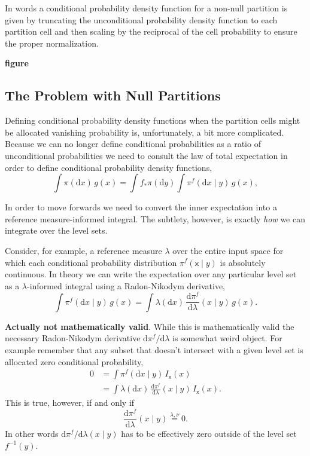 \documentclass[11pt, oneside]{article}
\newcommand{\rnd}[2]{
  \ensuremath{ \frac{ \mathrm{d} #1}{ \mathrm{d} #2 } }
}
\begin{document}
In words a conditional probability density function for a non-null partition is given 
by truncating the unconditional probability density function to each partition cell 
and then scaling by the reciprocal of the cell probability to ensure the proper 
normalization.

\textbf{figure}

\subsection{The Problem with Null Partitions}

Defining conditional probability density functions when the partition cells might 
be allocated vanishing probability is, unfortunately, a bit more complicated.
Because we can no longer define conditional probabilities as a ratio of unconditional 
probabilities we need to consult the law of total expectation in order to define 
conditional probability density functions,
%
\begin{equation*}
\int \pi( \mathrm{d} x ) \, g(x)
=
\int f_{*} \pi (\mathrm{d} y) \int \pi^{f}( \mathrm{d}x \mid y ) \, g(x),
\end{equation*}

In order to move forwards we need to convert the inner expectation into a reference 
measure-informed integral.  The subtlety, however, is exactly \emph{how} we can 
integrate over the level sets.

Consider, for example, a reference measure $\lambda$ over the entire input space
for which each conditional probability distribution $\pi^{f}( \mathsf{x} \mid y)$
is absolutely continuous.  In theory we can write the expectation over any 
particular level set as a $\lambda$-informed integral using a Radon-Nikodym
derivative,
%
\begin{equation*}
\int \pi^{f}( \mathrm{d}x \mid y ) \, g(x)
=
\int \lambda( \mathrm{d} x ) \, \rnd{ \pi^{f} }{ \lambda} (x \mid y) \, g(x).
\end{equation*}

\textbf{Actually not mathematically valid}.
While this is mathematically valid the necessary Radon-Nikodym derivative 
$\mathrm{d} \pi^{f} / \mathrm{d} \lambda$ is somewhat weird object.  For example 
remember that any subset that doesn't intersect with a given level set is allocated 
zero conditional probability,
%
\begin{align*}
0
&=
\int \pi^{f}( \mathrm{d}x \mid y ) \, I_{\mathsf{x}}(x)
\\
&=
\int \lambda( \mathrm{d} x ) \, \rnd{ \pi^{f} }{ \lambda } (x \mid y) \, I_{\mathsf{x}}(x).
\end{align*}
%
This is true, however, if and only if
%
\begin{equation*}
\rnd{ \pi^{f} }{ \lambda } (x \mid y) \overset{\lambda, \nu}{=} 0.
\end{equation*}
%
In other words $\mathrm{d} \pi^{f} / \mathrm{d} \lambda(x \mid y)$ has to be effectively 
zero outside of the level set $f^{-1}(y)$.
\end{document}
